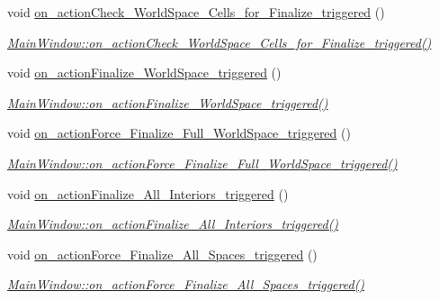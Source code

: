 \begin{DoxyCompactItemize}
void \hyperlink{class_main_window_aa95e768258ffcd2b4d8f2460e620f9db}{on\+\_\+action\+Check\+\_\+\+World\+Space\+\_\+\+Cells\+\_\+for\+\_\+\+Finalize\+\_\+triggered} ()
\begin{DoxyCompactList}\small\item\em \hyperlink{class_main_window_aa95e768258ffcd2b4d8f2460e620f9db}{Main\+Window\+::on\+\_\+action\+Check\+\_\+\+World\+Space\+\_\+\+Cells\+\_\+for\+\_\+\+Finalize\+\_\+triggered()} \end{DoxyCompactList}\item 
void \hyperlink{class_main_window_a583a8bf84d1bde5fcf6af19accaa625c}{on\+\_\+action\+Finalize\+\_\+\+World\+Space\+\_\+triggered} ()
\begin{DoxyCompactList}\small\item\em \hyperlink{class_main_window_a583a8bf84d1bde5fcf6af19accaa625c}{Main\+Window\+::on\+\_\+action\+Finalize\+\_\+\+World\+Space\+\_\+triggered()} \end{DoxyCompactList}\item 
void \hyperlink{class_main_window_a39ce027d7a98f94efdb5dce1204c6b76}{on\+\_\+action\+Force\+\_\+\+Finalize\+\_\+\+Full\+\_\+\+World\+Space\+\_\+triggered} ()
\begin{DoxyCompactList}\small\item\em \hyperlink{class_main_window_a39ce027d7a98f94efdb5dce1204c6b76}{Main\+Window\+::on\+\_\+action\+Force\+\_\+\+Finalize\+\_\+\+Full\+\_\+\+World\+Space\+\_\+triggered()} \end{DoxyCompactList}\item 
void \hyperlink{class_main_window_a0976f59dc5b7864ab50343653dfc48ac}{on\+\_\+action\+Finalize\+\_\+\+All\+\_\+\+Interiors\+\_\+triggered} ()
\begin{DoxyCompactList}\small\item\em \hyperlink{class_main_window_a0976f59dc5b7864ab50343653dfc48ac}{Main\+Window\+::on\+\_\+action\+Finalize\+\_\+\+All\+\_\+\+Interiors\+\_\+triggered()} \end{DoxyCompactList}\item 
void \hyperlink{class_main_window_a2ac15d9b187bae1395956be2636bf84b}{on\+\_\+action\+Force\+\_\+\+Finalize\+\_\+\+All\+\_\+\+Spaces\+\_\+triggered} ()
\begin{DoxyCompactList}\small\item\em \hyperlink{class_main_window_a2ac15d9b187bae1395956be2636bf84b}{Main\+Window\+::on\+\_\+action\+Force\+\_\+\+Finalize\+\_\+\+All\+\_\+\+Spaces\+\_\+triggered()} \end{DoxyCompactList}\item 

\end{DoxyCompactItemize}
